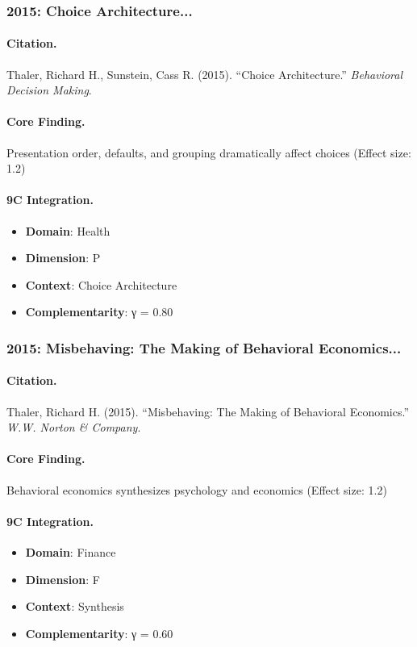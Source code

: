 \subsubsection{2015: Choice Architecture...}

\paragraph{Citation.}
Thaler, Richard H., Sunstein, Cass R. (2015). ``Choice Architecture.''
\textit{Behavioral Decision Making}.

\paragraph{Core Finding.}
Presentation order, defaults, and grouping dramatically affect choices (Effect size: 1.2)

\paragraph{9C Integration.}
\begin{itemize}[nosep]
  \item \textbf{Domain}: Health
  \item \textbf{Dimension}: P
  \item \textbf{Context}: Choice Architecture
  \item \textbf{Complementarity}: γ = 0.80
\end{itemize}

\subsubsection{2015: Misbehaving: The Making of Behavioral Economics...}

\paragraph{Citation.}
Thaler, Richard H. (2015). ``Misbehaving: The Making of Behavioral Economics.''
\textit{W.W. Norton & Company}.

\paragraph{Core Finding.}
Behavioral economics synthesizes psychology and economics (Effect size: 1.2)

\paragraph{9C Integration.}
\begin{itemize}[nosep]
  \item \textbf{Domain}: Finance
  \item \textbf{Dimension}: F
  \item \textbf{Context}: Synthesis
  \item \textbf{Complementarity}: γ = 0.60
\end{itemize}

